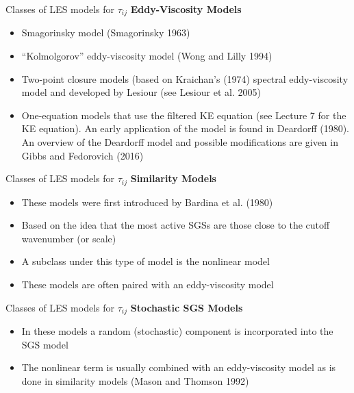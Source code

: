 
\begin{frame}{Classes of LES models for $\tau_{ij}$}
\textbf{Eddy-Viscosity Models}
\begin{itemize}
	\item Smagorinsky model (Smagorinsky 1963)
	\item ``Kolmolgorov'' eddy-viscosity model (Wong and Lilly 1994)
	\item Two-point closure models (based on Kraichan's (1974) spectral eddy-viscosity model and developed by Lesiour (see Lesiour et al. 2005)
	\item One-equation models that use the filtered KE equation (see Lecture 7 for the KE equation). An early application of the model is found in Deardorff (1980). An overview of the Deardorff model and possible modifications are given in Gibbs and Fedorovich (2016)
\end{itemize}

\end{frame}


\begin{frame}{Classes of LES models for $\tau_{ij}$}
\textbf{Similarity Models}
\begin{itemize}
	\item These models were first introduced by Bardina et al. (1980)
	\item Based on the idea that the most active SGSs are those close to the cutoff wavenumber (or scale)
	\item A subclass under this type of model is the nonlinear model
	\item These models are often paired with an eddy-viscosity model
\end{itemize}

\end{frame}


\begin{frame}{Classes of LES models for $\tau_{ij}$}
\textbf{Stochastic SGS Models}
\begin{itemize}
	\item In these models a random (stochastic) component is incorporated into the SGS model
	\item The nonlinear term is usually combined with an eddy-viscosity model as is done in similarity models (Mason and Thomson 1992)
\end{itemize}

\end{frame}


